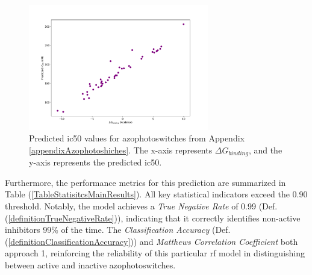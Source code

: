 \documentclass[11pt]{article}
\begin{document}
\begin{figure}[H]
	\centering
	\includegraphics[width=0.7\textwidth, trim={1.75cm 0.8cm 2.5cm 2cm}, clip]{../Plots/GbindingVSIC50.pdf}
	\caption{Predicted \gls{ic50} values for azophotoswitches from Appendix \ref{appendixAzophotoshiches}. The x-axis represents $\Delta G_{binding}$, and the y-axis represents the predicted \gls{ic50}.}
	\label{figureGraphicGbindingIC50}
\end{figure}

Furthermore, the performance metrics for this prediction are summarized in Table (\ref{TableStatisitcsMainResults}). All key statistical indicators exceed the 0.90 threshold. Notably, the model achieves a \emph{True Negative Rate} of 0.99 (Def. (\ref{definitionTrueNegativeRate})), indicating that it correctly identifies non-active inhibitors 99\% of the time. The \emph{Classification Accuracy} (Def. (\ref{definitionClassificationAccuracy})) and \emph{Matthews Correlation Coefficient} both approach 1, reinforcing the reliability of this particular \gls{rf} model in distinguishing between active and inactive azophotoswitches.
\end{document}
